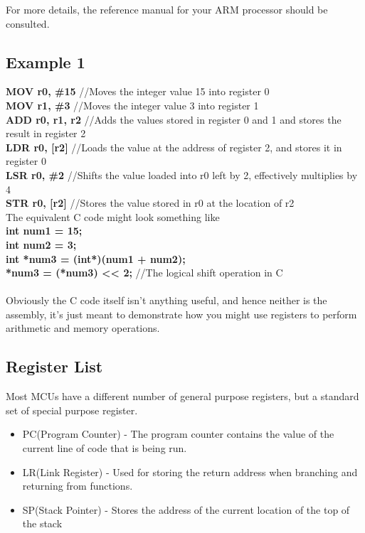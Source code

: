 \documentclass[10pt]{article}
\begin{document}
For more details, the reference manual for your ARM processor should be consulted.\\

\subsection{Example 1}
\textbf{MOV r0, \#15} //Moves the integer value 15 into register 0\\ 
\textbf{MOV r1, \#3} //Moves the integer value 3 into register 1\\
\textbf{ADD r0, r1, r2} //Adds the values stored in register 0 and 1 and stores the result in register 2\\
\textbf{LDR r0, [r2]} //Loads the value at the address of register 2, and stores it in register 0\\
\textbf{LSR r0, \#2} //Shifts the value loaded into r0 left by 2, effectively multiplies by 4\\
\textbf{STR r0, [r2]} //Stores the value stored in r0 at the location of r2\\

The equivalent C code might look something like\\
\textbf{int num1 = 15; \\
int num2 = 3; \\
int *num3 = (int*)(num1 + num2); \\
*num3 = (*num3) << 2;} //The logical shift operation in C\\ \\

Obviously the C code itself isn't anything useful, and hence neither is the assembly, it's just meant to demonstrate how you might use registers to perform arithmetic and memory operations.

\subsection{Register List}
Most MCUs have a different number of general purpose registers, but a standard set of special purpose register.
\begin{itemize}
\item PC(Program Counter) - The program counter contains the value of the current line of code that is being run.
\item LR(Link Register) - Used for storing the return address when branching and returning from functions.
\item SP(Stack Pointer) - Stores the address of the current location of the top of the stack
\end{itemize}
\end{document}
